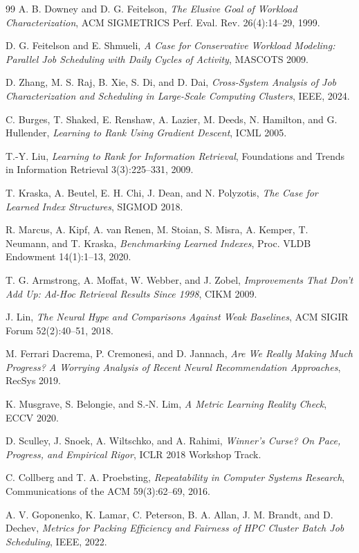 \documentclass[11pt,twocolumn]{article}
\begin{document}
\begin{thebibliography}{99}
 A. B. Downey and D. G. Feitelson, \emph{The Elusive Goal of Workload Characterization}, ACM SIGMETRICS Perf. Eval. Rev. 26(4):14--29, 1999.

 D. G. Feitelson and E. Shmueli, \emph{A Case for Conservative Workload Modeling: Parallel Job Scheduling with Daily Cycles of Activity}, MASCOTS 2009.

 D. Zhang, M. S. Raj, B. Xie, S. Di, and D. Dai, \emph{Cross-System Analysis of Job Characterization and Scheduling in Large-Scale Computing Clusters}, IEEE, 2024.

 C. Burges, T. Shaked, E. Renshaw, A. Lazier, M. Deeds, N. Hamilton, and G. Hullender, \emph{Learning to Rank Using Gradient Descent}, ICML 2005.

 T.-Y. Liu, \emph{Learning to Rank for Information Retrieval}, Foundations and Trends in Information Retrieval 3(3):225--331, 2009.

 T. Kraska, A. Beutel, E. H. Chi, J. Dean, and N. Polyzotis, \emph{The Case for Learned Index Structures}, SIGMOD 2018.

 R. Marcus, A. Kipf, A. van Renen, M. Stoian, S. Misra, A. Kemper, T. Neumann, and T. Kraska, \emph{Benchmarking Learned Indexes}, Proc. VLDB Endowment 14(1):1--13, 2020.

 T. G. Armstrong, A. Moffat, W. Webber, and J. Zobel, \emph{Improvements That Don't Add Up: Ad-Hoc Retrieval Results Since 1998}, CIKM 2009.

 J. Lin, \emph{The Neural Hype and Comparisons Against Weak Baselines}, ACM SIGIR Forum 52(2):40--51, 2018.

 M. Ferrari Dacrema, P. Cremonesi, and D. Jannach, \emph{Are We Really Making Much Progress? A Worrying Analysis of Recent Neural Recommendation Approaches}, RecSys 2019.

 K. Musgrave, S. Belongie, and S.-N. Lim, \emph{A Metric Learning Reality Check}, ECCV 2020.

 D. Sculley, J. Snoek, A. Wiltschko, and A. Rahimi, \emph{Winner's Curse? On Pace, Progress, and Empirical Rigor}, ICLR 2018 Workshop Track.

 C. Collberg and T. A. Proebsting, \emph{Repeatability in Computer Systems Research}, Communications of the ACM 59(3):62--69, 2016.

 A. V. Goponenko, K. Lamar, C. Peterson, B. A. Allan, J. M. Brandt, and D. Dechev, \emph{Metrics for Packing Efficiency and Fairness of HPC Cluster Batch Job Scheduling}, IEEE, 2022.

\end{thebibliography}
\end{document}

